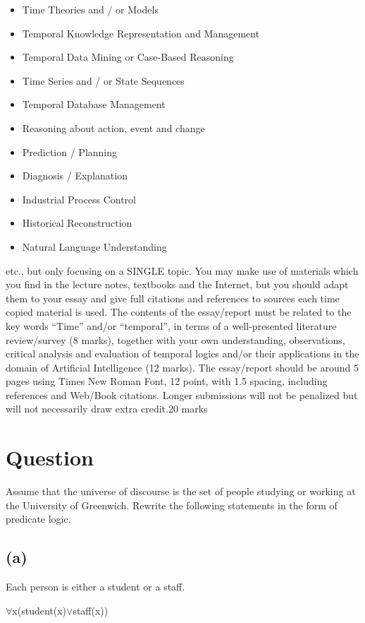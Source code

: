 \documentclass[12pt,a4paper]{article}
\begin{document}
{\begin{itemize}
	
    \item Time Theories and / or Models
	\item Temporal Knowledge Representation and Management
	 \item  Temporal Data Mining or Case-Based Reasoning
	 \item  Time Series and / or State Sequences
	  \item Temporal Database Management
	\item  Reasoning about action, event and change
	 \item Prediction / Planning
	\item  Diagnosis / Explanation
	\item Industrial Process Control
    \item Historical Reconstruction
	\item Natural Language Understanding
\end{itemize}
	etc., but only focusing on a SINGLE topic. You may make use of materials which you find in the lecture notes, textbooks and the Internet, but you should adapt them to your essay and give full citations and references to sources each time copied material is used. The contents of the essay/report must be related to the key words “Time” and/or “temporal”, in terms of a well-presented literature review/survey (8 marks), together with your own understanding, observations, critical analysis and evaluation of temporal logics and/or their applications in the domain of Artificial Intelligence (12 marks). The essay/report should be around 5 pages using Times New Roman Font, 12 point, with 1.5 spacing, including references and Web/Book citations. Longer submissions will not be penalized but will not necessarily draw extra credit.{20 marks}
	
	\newpage
	
	\section{Question} 
	Assume that the universe of discourse is the set of people studying or working at the University of Greenwich. Rewrite the following statements in the form of predicate logic.
		\subsection{(a)}
		Each person is either a student or a staff.
		
	$\forall$x(student(x)$\lor$staff(x))
		
		
		
}
\end{document}
